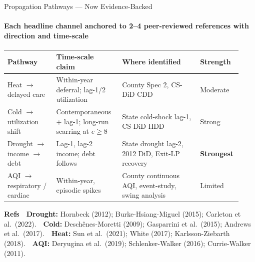 \documentclass[aspectratio=169,11pt]{beamer}
\newcommand{\emphcolor}[1]{{\color{WarmOrange}\textbf{#1}}}
\newcommand{\tealtext}[1]{{\color{Teal}#1}}
\begin{document}
\begin{frame}{Propagation Pathways --- Now Evidence-Backed}
  \framesubtitle{Each headline channel anchored to 2--4 peer-reviewed references with direction and time-scale}
  \scriptsize
  \begin{tabular}{@{}>{\raggedright\arraybackslash}p{0.20\linewidth}>{\raggedright\arraybackslash}p{0.27\linewidth}>{\raggedright\arraybackslash}p{0.32\linewidth}>{\raggedright\arraybackslash}p{0.14\linewidth}@{}}
    \toprule
    Pathway & Time-scale claim & Where identified & Strength \\
    \midrule
    Heat \(\to\) delayed care
      & Within-year deferral; lag-1/2 utilization
      & County Spec 2, CS-DiD CDD
      & Moderate \\
    Cold \(\to\) utilization shift
      & Contemporaneous + lag-1; long-run scarring at \(e\geq 8\)
      & State cold-shock lag-1, CS-DiD HDD
      & Strong \\
    Drought \(\to\) income \(\to\) debt
      & Lag-1, lag-2 income; debt follows
      & State drought lag-2, 2012 DiD, Exit-LP recovery
      & \emphcolor{Strongest} \\
    AQI \(\to\) respiratory / cardiac
      & Within-year, episodic spikes
      & County continuous AQI, event-study, swing analysis
      & Limited \\
    \bottomrule
  \end{tabular}
  \vspace{0.35em}
  \tiny
  \textbf{\tealtext{Refs}}\ \ \textbf{Drought:} Hornbeck (2012); Burke-Hsiang-Miguel (2015); Carleton et al.\ (2022).\ \
  \textbf{Cold:} Desch\^enes-Moretti (2009); Gasparrini et al.\ (2015); Andrews et al.\ (2017).\ \
  \textbf{Heat:} Sun et al.\ (2021); White (2017); Karlsson-Ziebarth (2018).\ \
  \textbf{AQI:} Deryugina et al.\ (2019); Schlenker-Walker (2016); Currie-Walker (2011).
\end{frame}
\end{document}
